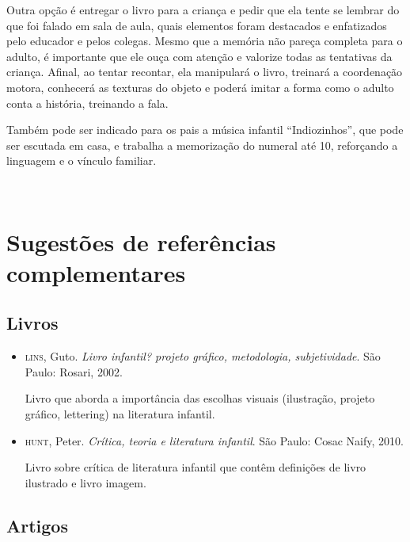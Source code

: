 \documentclass[11pt]{extarticle}
\begin{document}
\begin{enumerate}
Outra opção é entregar o livro para a criança e pedir que ela tente se lembrar
do que foi falado em sala de aula, quais elementos foram destacados e enfatizados pelo educador e pelos colegas. Mesmo que a memória não pareça 
completa para o adulto, é importante que ele ouça com atenção e 
valorize todas as tentativas da criança. Afinal, ao tentar recontar, 
ela manipulará o livro, treinará a coordenação motora, conhecerá as texturas 
do objeto e poderá imitar a forma como o adulto 
conta a história, treinando a fala. 

Também pode ser indicado para os pais a música infantil ``Indiozinhos'', que pode ser escutada em casa, e trabalha a memorização do numeral até 10, reforçando a linguagem e o vínculo familiar. 
\end{enumerate}

 
\section{Sugestões de referências complementares}

\subsection{Livros} 

\begin{itemize}
\item \textsc{lins}, Guto. \textit{Livro infantil? projeto gráfico, metodologia, subjetividade}. São Paulo: Rosari, 2002.

Livro que aborda a importância das escolhas visuais (ilustração, projeto gráfico, lettering) na literatura infantil.  

\item \textsc{hunt}, Peter. \textit{Crítica, teoria e literatura infantil}. São Paulo: Cosac Naify, 2010.

Livro sobre crítica de literatura infantil que contêm definições de livro ilustrado e livro imagem. 
\end{itemize}

\subsection{Artigos}
\end{document}
